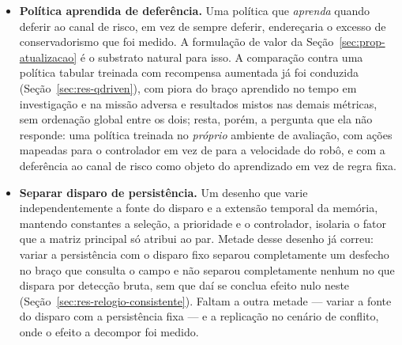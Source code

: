 \begin{itemize}
    \item \textbf{Política aprendida de deferência.} Uma política que
    \emph{aprenda} quando deferir ao canal de risco, em vez de sempre deferir,
    endereçaria o excesso de conservadorismo que foi medido. A formulação de valor da
    Seção~\ref{sec:prop-atualizacao} é o substrato natural para isso. A comparação
    contra uma política tabular treinada com recompensa aumentada já foi conduzida
    (Seção~\ref{sec:res-qdriven}), com piora do braço aprendido no tempo em investigação
    e na missão adversa e resultados mistos nas demais métricas, sem ordenação global
    entre os dois; resta, porém, a
    pergunta que ela não responde: uma política treinada no \emph{próprio}
    ambiente de avaliação, com ações mapeadas para o controlador em vez de para a
    velocidade do robô, e com a deferência ao canal de risco como objeto do
    aprendizado em vez de regra fixa.

    \item \textbf{Separar disparo de persistência.} Um desenho que varie
    independentemente a fonte do disparo e a extensão temporal da memória, mantendo
    constantes a seleção, a prioridade e o controlador, isolaria o fator que a matriz
    principal só atribui ao par. Metade desse desenho já correu: variar a persistência
    com o disparo fixo separou completamente um desfecho no braço que consulta o campo
    e não separou completamente nenhum no que dispara por detecção bruta, sem que daí
    se conclua efeito nulo neste
    (Seção~\ref{sec:res-relogio-consistente}). Faltam a
    outra metade --- variar a fonte do disparo com a persistência fixa --- e a
    replicação no cenário de conflito, onde o efeito a decompor foi medido.


\end{itemize}
